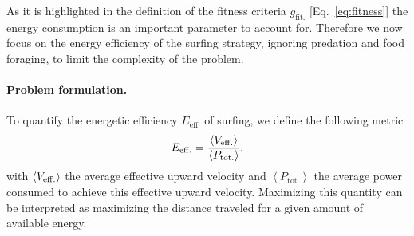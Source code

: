 As it is highlighted in the definition of the fitness criteria $g_{\mathrm{fit.}}$ [Eq.~\eqref{eq:fitness}] the energy consumption is an important parameter to account for.
Therefore we now focus on the energy efficiency of the surfing strategy, ignoring predation and food foraging, to limit the complexity of the problem.

\paragraph{Problem formulation.} 

To quantify the energetic efficiency $E_{\mathrm{eff.}}$ of surfing, we define the following metric
\begin{equation}\label{eq:definition_efficiency}
	E_{\mathrm{eff.}} = \frac{\left\langle V_{\mathrm{eff.}} \right\rangle}{\left\langle P_{\mathrm{tot.}} \right\rangle}.
\end{equation}
with $\left\langle V_{\mathrm{eff.}} \right\rangle$ the average effective upward velocity and $\left\langle P_{\mathrm{tot.}} \right\rangle$ the average power consumed to achieve this effective upward velocity.
Maximizing this quantity can be interpreted as maximizing the distance traveled for a given amount of available energy.

